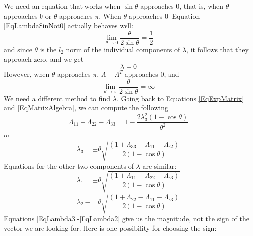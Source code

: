\documentclass[10pt,letterpaper,oneside,notitlepage]{article}
\begin{document}
We need an equation that works when $\sin\theta$ approaches 0, that is, when $\theta$ approaches 0 or $\theta$ approaches $\pi$. When $\theta$ approaches 0, Equation \ref{EqLambdaSinNot0} actually behaves well: 
\begin{equation}
\lim_{\theta \to 0}\frac{\theta}{2\sin\theta} = \frac{1}{2}
\end{equation}
and since $\theta$ is the $l_2$ norm of the individual components of $\lambda$, it follows that they approach zero, and we get
\begin{equation}
\label{EqLambdaTheta0}
\lambda = 0
\end{equation}
However, when $\theta$ approaches $\pi$, $\Lambda - \Lambda^T$ approaches 0, and 
\begin{equation}
\lim_{\theta \to \pi}\frac{\theta}{2\sin\theta} = \infty
\end{equation}
We need a different method to find $\lambda$. Going back to Equations \ref{EqExpMatrix} and \ref{EqMatrixAlgebra}, we can compute the following:
\begin{equation}
\Lambda_{11}+\Lambda_{22}-\Lambda_{33} = 1 - \frac{2\lambda_3^2(1-\cos\theta)}{\theta^2} 
\end{equation}
or
\begin{equation}
\label{EqLambda3}
\lambda_3 = \pm \theta\sqrt{ \frac{\left(1 + \Lambda_{33} - \Lambda_{11} - \Lambda_{22}\right)}{2\left(1-\cos\theta\right)}   }
\end{equation}
Equations for the other two components of $\lambda$ are similar:
\begin{equation}
\label{EqLambda1}
\lambda_1 = \pm \theta\sqrt{ \frac{\left(1 + \Lambda_{11} - \Lambda_{22} - \Lambda_{33}\right)}{2\left(1-\cos\theta\right)}   }
\end{equation}
\begin{equation}
\label{EqLambda2}
\lambda_2 = \pm \theta\sqrt{ \frac{\left(1 + \Lambda_{22} - \Lambda_{11} - \Lambda_{33}\right)}{2\left(1-\cos\theta\right)}   }
\end{equation}
Equations \ref{EqLambda3}-\ref{EqLambda2} give us the magnitude, not the sign of the vector we are looking for. Here is one possibility for choosing the sign:
\end{document}
